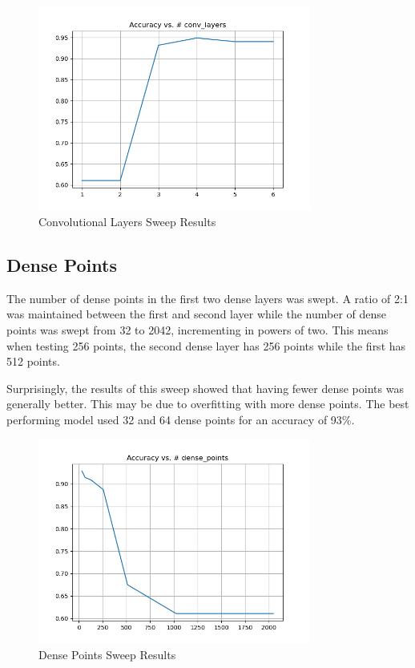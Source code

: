 \documentclass{article}
\begin{document}
\begin{figure}[H]
    \centering
    \includegraphics[width=0.8\textwidth]{../media/conv_layers_sweep.png}
    \caption{Convolutional Layers Sweep Results}
    \label{fig:conv}
\end{figure}


\subsection{Dense Points}

The number of dense points in the first two dense layers was swept. A ratio of 2:1 was maintained between the first and second layer  while the number of dense points was swept from 32 to 2042, incrementing in powers of two. This means when testing 256 points, the second dense layer has 256 points while the first has 512 points. 

Surprisingly, the results of this sweep showed that having fewer dense points was generally better. This may be due to overfitting with more dense points. The best performing model used 32 and 64 dense points for an accuracy of 93\%. 

\begin{figure}[H]
    \centering
    \includegraphics[width=0.8\textwidth]{../media/dense_points_sweep.png}
    \caption{Dense Points Sweep Results}
    \label{fig:dense}
\end{figure}
\end{document}
